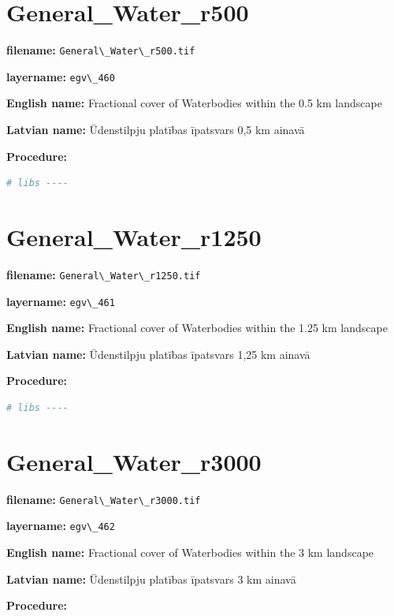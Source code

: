 \documentclass[
]{book}
\newcommand{\passthrough}[1]{#1}
\begin{document}
\section{General\_Water\_r500}\label{ch06.460}

\textbf{filename:} \passthrough{\lstinline!General\_Water\_r500.tif!}

\textbf{layername:} \passthrough{\lstinline!egv\_460!}

\textbf{English name:} Fractional cover of Waterbodies within the 0.5 km landscape

\textbf{Latvian name:} Ūdenstilpju platības īpatsvars 0,5 km ainavā

\textbf{Procedure:}

\begin{lstlisting}[language=R]
# libs ----
\end{lstlisting}

\section{General\_Water\_r1250}\label{ch06.461}

\textbf{filename:} \passthrough{\lstinline!General\_Water\_r1250.tif!}

\textbf{layername:} \passthrough{\lstinline!egv\_461!}

\textbf{English name:} Fractional cover of Waterbodies within the 1.25 km landscape

\textbf{Latvian name:} Ūdenstilpju platības īpatsvars 1,25 km ainavā

\textbf{Procedure:}

\begin{lstlisting}[language=R]
# libs ----
\end{lstlisting}

\section{General\_Water\_r3000}\label{ch06.462}

\textbf{filename:} \passthrough{\lstinline!General\_Water\_r3000.tif!}

\textbf{layername:} \passthrough{\lstinline!egv\_462!}

\textbf{English name:} Fractional cover of Waterbodies within the 3 km landscape

\textbf{Latvian name:} Ūdenstilpju platības īpatsvars 3 km ainavā

\textbf{Procedure:}
\end{document}
